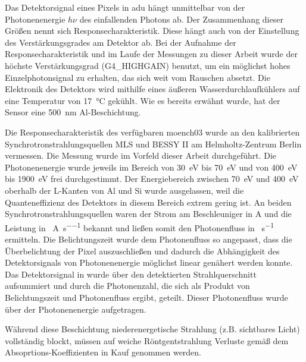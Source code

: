 \noindent
Das Detektorsignal eines Pixels in \gls{adu} hängt unmittelbar von der Photonenenergie $h\nu$ des einfallenden Photons ab. Der Zusammenhang dieser Größen nennt sich Responsecharakteristik. Diese hängt auch von der Einstellung des Verstärkungsgrades am Detektor ab. Bei der Aufnahme der Responsecharakteristik und im Laufe der Messungen zu dieser Arbeit wurde der höchste Verstärkungsgrad (G4\_HIGHGAIN) benutzt, um ein möglichst hohes Einzelphotonsignal zu erhalten, das sich weit vom Rauschen absetzt. Die Elektronik des Detektors wird mithilfe eines äußeren Wasserdurchlaufkühlers auf eine Temperatur von \SI{17}{\celsius} gekühlt. Wie es bereits erwähnt wurde, hat der Sensor eine \SI{500}{\nano\meter} Al-Beschichtung.
%     

\noindent
Die Responsecharakteristik des verfügbaren \gls{moench03} wurde an den kalibrierten Synchrotronstrahlungsquellen MLS und BESSY II am Helmholtz-Zentrum Berlin vermessen. Die Messung wurde im Vorfeld dieser Arbeit durchgeführt. Die Photonenenergie wurde jeweils im Bereich von \SI{30}{\eV} bis \SI{70}{\eV} und von \SI{400}{\eV} bis \SI{1900}{\eV} frei durchgestimmt. Der Energiebereich zwischen \SI{70}{\eV} und \SI{400}{\eV} oberhalb der L-Kanten von Al und Si wurde ausgelassen, weil die Quanteneffizienz des Detektors in diesem Bereich extrem gering ist. An beiden Synchrotronstrahlungsquellen waren der Strom am Beschleuniger in \si{\ampere} und die Leistung in \si{\photons\per\ampere\per\second} bekannt und ließen somit den Photonenfluss in \si{\photons\per\second} ermitteln. Die Belichtungszeit wurde dem Photonenfluss so angepasst, dass die Überbelichtung der Pixel auszuschließen und dadurch die Abhängigkeit des Detektorsignals von Photonenenergie möglichst linear genähert werden konnte. Das Detektorsignal in \si{\adu} wurde über den detektierten Strahlquerschnitt aufsummiert und durch die Photonenzahl, die sich als Produkt von Belichtungszeit und Photonenfluss ergibt, geteilt. Dieser Photonenfluss wurde über der Photonenenergie aufgetragen.

\noindent
Während diese Beschichtung niederenergetische Strahlung (z.B. sichtbares Licht) vollständig blockt, müssen auf weiche Röntgentstrahlung Verluste gemäß dem Absoprtions-Koeffizienten in Kauf genommen werden.

